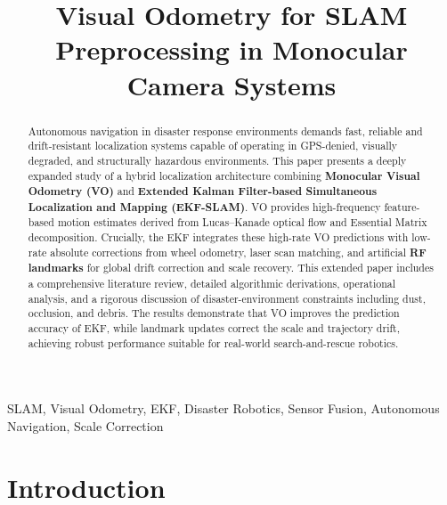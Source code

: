 \documentclass[conference]{IEEEtran}
\begin{document}
\title{Visual Odometry for SLAM Preprocessing in Monocular Camera Systems}

\author{
\and
{}
}


\maketitle

\begin{abstract}
Autonomous navigation in disaster response environments demands fast, reliable and drift-resistant localization systems capable of operating in GPS-denied, visually degraded, and structurally hazardous environments. This paper presents a deeply expanded study of a hybrid localization architecture combining \textbf{Monocular Visual Odometry (VO)} and \textbf{Extended Kalman Filter-based Simultaneous Localization and Mapping (EKF-SLAM)}. VO provides high-frequency feature-based motion estimates derived from Lucas–Kanade optical flow and Essential Matrix decomposition. Crucially, the EKF integrates these high-rate VO predictions with low-rate absolute corrections from wheel odometry, laser scan matching, and artificial \textbf{RF landmarks} for global drift correction and scale recovery. This extended paper includes a comprehensive literature review, detailed algorithmic derivations, operational analysis, and a rigorous discussion of disaster-environment constraints including dust, occlusion, and debris. The results demonstrate that VO improves the prediction accuracy of EKF, while landmark updates correct the scale and trajectory drift, achieving robust performance suitable for real-world search-and-rescue robotics.
\end{abstract}

\begin{IEEEkeywords}
SLAM, Visual Odometry, EKF, Disaster Robotics, Sensor Fusion, Autonomous Navigation, Scale Correction
\end{IEEEkeywords}

\section{Introduction}
\end{document}
